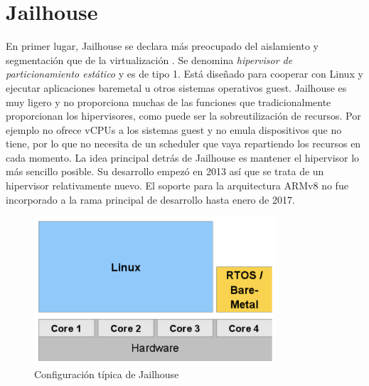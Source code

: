 \section{Jailhouse} \label{jailhouse_sota}

En primer lugar, Jailhouse \cite{jailhouse_elc2017} se declara más preocupado del aislamiento y segmentación que de la virtualización \cite{jailhouse_p1}. Se denomina \textit{hipervisor de particionamiento estático} y es de tipo 1. Está diseñado para cooperar con Linux y ejecutar aplicaciones baremetal u otros sistemas operativos guest. Jailhouse es muy ligero y no proporciona muchas de las funciones que tradicionalmente proporcionan los hipervisores, como puede ser la sobreutilización de recursos. Por ejemplo no ofrece vCPUs a los sistemas guest y no emula dispositivos que no tiene, por lo que no necesita de un scheduler que vaya repartiendo los recursos en cada momento. La idea principal detrás de Jailhouse es mantener el hipervisor lo más sencillo posible. Su desarrollo empezó en 2013 así que se trata de un hipervisor relativamente nuevo. El soporte para la arquitectura ARMv8 no fue incorporado a la rama principal de desarrollo hasta enero de 2017.\\

\begin{figure}[h]
  \centering
  \includegraphics[width=0.80\textwidth]{recursos/jailhouse_1.png}
  \caption{Configuración típica de Jailhouse}
  \label{fig:jail_1}
\end{figure}

